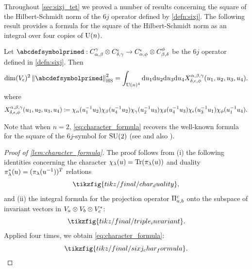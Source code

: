 \documentclass[notitlepage, 10pt]{article}
\begin{document}
Throughout \cref{sec:sixj_tet} we proved a number of results concerning the square of the Hilbert-Schmidt norm of the $6j$ operator defined by \cref{defn:sixj}.
The following result provides a formula for the square of the Hilbert-Schmidt norm as an integral over four copies of $\operatorname{U}(n)$.
\begin{lem}
    \label{lem:character_formula}
    Let $\abcdefsymbolprimed : C^{\yc}_{\ya,\yb} \ot C^{\ye}_{\yd,\yc} \to C^{\ye}_{\ya, \yf} \ot C^{\yf}_{\yb,\yd}$ be the $6j$ operator defined in \cref{defn:sixj}.
    Then
    \begin{equation}
        \label{eq:character_formula}
        \dim(V_{\ye})^{2}\norm{\abcdefsymbolprimed}_{\mathrm{HS}}^{2}
        = \int_{\U(n)^{4}} \diff u_1 \diff u_2 \diff u_3 \diff u_4 X^{\ya,\yb,\yc}_{\yd,\ye,\yf}(u_1,u_2,u_3,u_4).
    \end{equation}
    where
    \begin{equation}
        X^{\alpha,\beta,\gamma}_{\delta,\epsilon,\phi}(u_1,u_2,u_3,u_4) \coloneqq \chi_{\alpha}(u_1^{-1}u_2)\chi_{\beta}(u_4^{-1}u_2)\chi_{\gamma}(u_2^{-1}u_3)\chi_{\delta}(u_4^{-1}u_3)\chi_{\epsilon}(u_3^{-1}u_1)\chi_{\phi}(u_1^{-1}u_4).
    \end{equation}
\end{lem}
Note that when $n = 2$, \cref{eq:character_formula} recovers the well-known formula for the square of the $6j$-symbol for $\operatorname{SU}(2)$ (see \cite[Equation (1)]{freidel2003asymptotics} and also \cite{barrett1998classical,freidel2000simple}).
\begin{proof}[Proof of \cref{lem:character_formula}]
    The proof follows from (i) the following identities concerning the character $\chi_{\lambda}(u) = \operatorname{Tr}(\pi_{\lambda}(u))$ and duality $\pi_{\lambda}^{*}(u) = (\pi_{\lambda}(u^{-1}))^{T}$ relations
    \begin{equation}
        \tikzfig{tikz/final/char_duality},
    \end{equation}
    and (ii) the integral formula for the projection operator $\Pi_{a,b}^{c}$ onto the subspace of invariant vectors in $V_{a} \otimes V_{b} \otimes V_{c}^{*}$:
    \begin{equation}
        \tikzfig{tikz/final/triple_invariant}.
    \end{equation}
    Applied four times, we obtain \cref{eq:character_formula}:
    \begin{equation}
        \tikzfig{tikz/final/sixj_char_formula}.
    \end{equation}
\end{proof}
\end{document}
